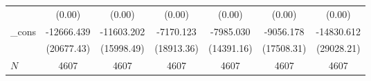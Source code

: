 {\begin{tabular}{l*{6}{c}}
            &                   (0.00)         &                   (0.00)         &                   (0.00)         &                   (0.00)         &                   (0.00)         &                   (0.00)         \\
\_cons      &               -12666.439         &               -11603.202         &                -7170.123         &                -7985.030         &                -9056.178         &               -14830.612         \\
            &               (20677.43)         &               (15998.49)         &               (18913.36)         &               (14391.16)         &               (17508.31)         &               (29028.21)         \\
\hline
\(N\)       &                     4607         &                     4607         &                     4607         &                     4607         &                     4607         &                     4607         \\
\hline\hline
\end{tabular}
}
